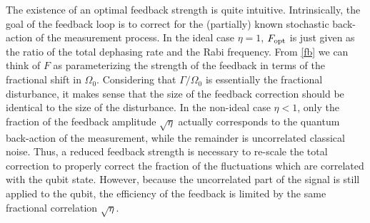 The existence of an optimal feedback strength is quite intuitive.  Intrinsically, the goal of the feedback loop is to correct for the (partially) known stochastic back-action of the measurement process.  In the ideal case $\eta = 1$, $F_{\rm opt}$ is just given as the ratio of the total dephasing rate and the Rabi frequency.  From \eqref{fb} we can think of $F$ as parameterizing the strength of the feedback in terms of the fractional shift in $\Omega_0$.  Considering that $\Gamma/\Omega_0$ is essentially the fractional disturbance, it makes sense that the size of the feedback correction should be identical to the size of the disturbance.  In the non-ideal case $\eta < 1$, only the fraction of the feedback amplitude $\sqrt{\eta}$ actually corresponds to the quantum back-action of the measurement, while the remainder is uncorrelated classical noise.  Thus, a reduced feedback strength is necessary to re-scale the total correction to properly correct the fraction of the fluctuations which are correlated with the qubit state.  However, because the uncorrelated part of the signal is still applied to the qubit, the efficiency of the feedback is limited by the same fractional correlation $\sqrt{\eta}$.











